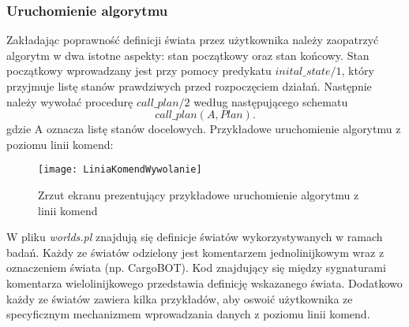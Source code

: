     \subsubsection{Uruchomienie algorytmu}
    Zakładając poprawność definicji świata przez użytkownika należy zaopatrzyć algorytm w dwa istotne aspekty: stan początkowy oraz stan końcowy. 
    Stan początkowy wprowadzany jest przy pomocy predykatu $inital\_state/1$, który przyjmuje listę stanów prawdziwych przed rozpoczęciem działań.
    Następnie należy wywołać procedurę $call\_plan/2$ według następującego schematu 
    \begin{equation}
        call\_plan(A,Plan).
    \end{equation}
    gdzie A oznacza listę stanów docelowych.
    Przykładowe uruchomienie algorytmu z poziomu linii komend:

    \begin{figure}[H]
        \texttt{[image: LiniaKomendWywolanie]}
        \centering
        \caption{Zrzut ekranu prezentujący przykładowe uruchomienie algorytmu z linii komend}
    \end{figure}

    W pliku \textit{worlds.pl} znajdują się definicje światów wykorzystywanych w ramach badań. Każdy ze światów odzielony jest komentarzem 
    jednolinijkowym wraz z oznaczeniem świata (np. CargoBOT). Kod znajdujący się między sygnaturami komentarza wielolinijkowego przedstawia 
    definicję wskazanego świata.
    Dodatkowo każdy ze światów zawiera kilka przykładów, aby oswoić użytkownika ze specyficznym mechanizmem wprowadzania danych 
    z poziomu linii komend.

